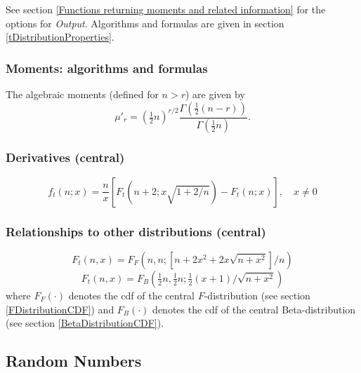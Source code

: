 \vspace{0.3cm}

See section \ref{Functions returning moments and related information} for the options for {\itshape\sffamily Output}. Algorithms and formulas are given in section \ref{tDistributionProperties}.



\subsubsection{Moments: algorithms and formulas}

The algebraic moments (defined for $n>r$) are given by
\begin{equation}
	\mu'_r = \left({\tfrac{1}{2}n}\right)^{r/2} \frac{\Gamma\left(\tfrac{1}{2}(n-r)\right)}{\Gamma\left(\tfrac{1}{2}n\right)}.
\end{equation}


\subsubsection{Derivatives (central)}
\begin{equation}
f_t(n;x) = \frac{n}{x}\left[F_t\left(n+2;x\sqrt{1+2/n}\right) -F_t(n;x)\right], \quad x\neq 0
\end{equation}



\subsubsection{Relationships to other distributions (central)}
\begin{equation}
F_t\left(n,x\right) = F_F\left(n, n; \left[n + 2x^2 + 2x\sqrt{n+x^2}\right]/n\right) 
\end{equation}
\begin{equation}
F_t\left(n,x\right) = F_B\left(\tfrac{1}{2}n, \tfrac{1}{2}n; \tfrac{1}{2}(x+1)/\sqrt{n+x^2}\right) 
\end{equation}
where $F_F(\cdot)$ denotes the cdf of the central $F$-distribution (see section \ref{FDistributionCDF}) and $F_B(\cdot)$ denotes the cdf of the central Beta-distribution (see section \ref{BetaDistributionCDF}).



\subsection{Random Numbers}
\label{tDistributionRandom}

